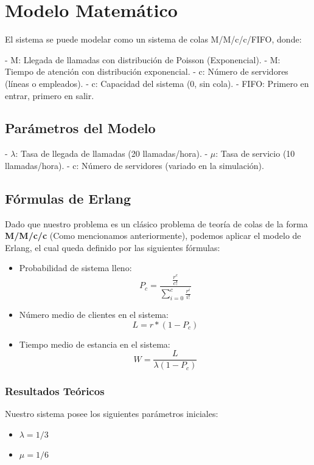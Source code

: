 \documentclass{article}
\begin{document}
\section{Modelo Matemático}

El sistema se puede modelar como un sistema de colas M/M/c/c/FIFO, donde:

- M: Llegada de llamadas con distribución de Poisson (Exponencial).
- M: Tiempo de atención con distribución exponencial.
- c: Número de servidores (líneas o empleados).
- c: Capacidad del sistema (0, sin cola).
- FIFO: Primero en entrar, primero en salir.


\subsection{Parámetros del Modelo}

- $\lambda$: Tasa de llegada de llamadas (20 llamadas/hora).
- $\mu$: Tasa de servicio (10 llamadas/hora).
- c: Número de servidores (variado en la simulación).

\subsection{Fórmulas de Erlang}

Dado que nuestro problema es un clásico problema de teoría de colas de la forma \textbf{M/M/c/c} (Como mencionamos anteriormente), podemos aplicar el modelo de Erlang, el cual queda definido por las siguientes fórmulas:

\begin{itemize}
    \item Probabilidad de sistema lleno: 
    \[
    P_c = \frac{\frac{r^c}{c!}}{\sum_{i=0}^{c} \frac{r^i}{i!}}
    \]
    \item Número medio de clientes en el sistema: 
    \[
    L = r*(1- P_c)
    \]
    \item Tiempo medio de estancia en el sistema: 
    \[
    W = \frac{L}{\lambda (1 - P_c)}
    \]
\end{itemize}

\subsubsection*{Resultados Teóricos}

Nuestro sistema posee los siguientes parámetros iniciales:
\begin{itemize}
    \item $\lambda = 1/3$
    \item $\mu = 1/6$
\end{itemize}
\end{document}
